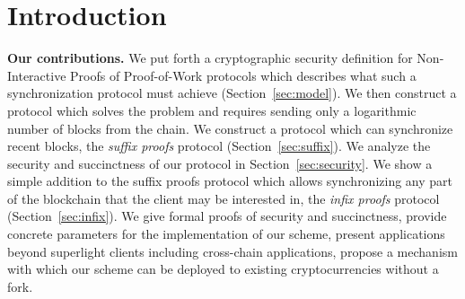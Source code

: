 \section{Introduction}


\noindent\textbf{Our contributions.}
We put forth a cryptographic security definition for
Non-Interactive Proofs of Proof-of-Work protocols which describes what such a
synchronization protocol must achieve (Section~\ref{sec:model}). We then
construct a protocol which solves the problem and requires sending only a
logarithmic number of blocks from the chain. We construct a protocol which can
synchronize recent blocks, the \emph{suffix proofs} protocol
(Section~\ref{sec:suffix}).
We analyze the security and succinctness of
our protocol in Section~\ref{sec:security}.
We show a simple addition to the suffix proofs protocol
which allows synchronizing any part of the blockchain that the client may be
interested in, the \emph{infix proofs} protocol (Section~\ref{sec:infix}).
We give formal proofs of security and succinctness, provide
concrete parameters for the implementation of our scheme, present applications
beyond superlight clients including cross-chain applications, propose a mechanism with which our scheme can
be deployed to existing cryptocurrencies without a fork.


%
%
%

%

